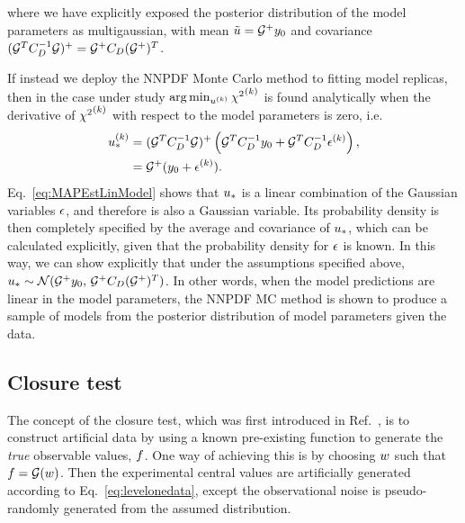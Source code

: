 where we have explicitly exposed the posterior distribution of
the model parameters as multigaussian, with mean
$\tilde{u} = \mathcal{G}^+ y_0$ and covariance
$(\mathcal{G}^T C_{D}^{-1} \mathcal{G})^+ = \mathcal{G}^+ C_{D} (\mathcal{G}^+)^T$.

If instead we deploy the NNPDF Monte
Carlo method to fitting model replicas, then in the case under study
$\arg\min_{u^{(k)}} {\chi^2}^{(k)}$ is found analytically when the derivative of
${\chi^2}^{(k)}$ with respect to the model parameters is zero, i.e.
\begin{equation}
    \begin{split}
        \label{eq:MAPEstLinModel}
        u_*^{(k)} &= (\mathcal{G}^T C_{D}^{-1} \mathcal{G})^+
        \left(
            \mathcal{G}^T C_{D}^{-1} y_0 +
            \mathcal{G}^T C_{D}^{-1} \epsilon^{(k)}
        \right), \\
        &= \mathcal{G}^+ (y_0 + \epsilon^{(k)}).
    \end{split}
\end{equation}
Eq.~\ref{eq:MAPEstLinModel} shows that $u_*$ is a linear
combination of the Gaussian variables $\epsilon$, and therefore is
also a Gaussian variable. Its
probability density is then completely specified by the average and
covariance of $u_*$, which can be calculated explicitly, given that the
probability density for $\epsilon$ is known.  In this way, we can show
explicitly that under the
assumptions specified above,
$u_* \sim \mathcal{N}(
    \mathcal{G}^+ y_0, \, \mathcal{G}^+ C_{D} (\mathcal{G}^+)^T
)$.
In other words, when the model predictions are linear in the model parameters,
the NNPDF MC method is shown to produce a sample of models from the posterior
distribution of model parameters given the data.

\subsection{Closure test}
\label{sec:closure-test-intro}

The concept of the closure test, which was first introduced in
Ref.~\cite{nnpdf30}, is to construct artificial data by using a known
pre-existing function to generate the {\em true} observable values, $f$.
One way of achieving this is by choosing $w$ such that $f =
\mathcal{G}(w)$. Then the experimental central values are artificially
generated according to Eq.~\ref{eq:levelonedata}, except the observational noise
is pseudo-randomly generated from the assumed distribution.

